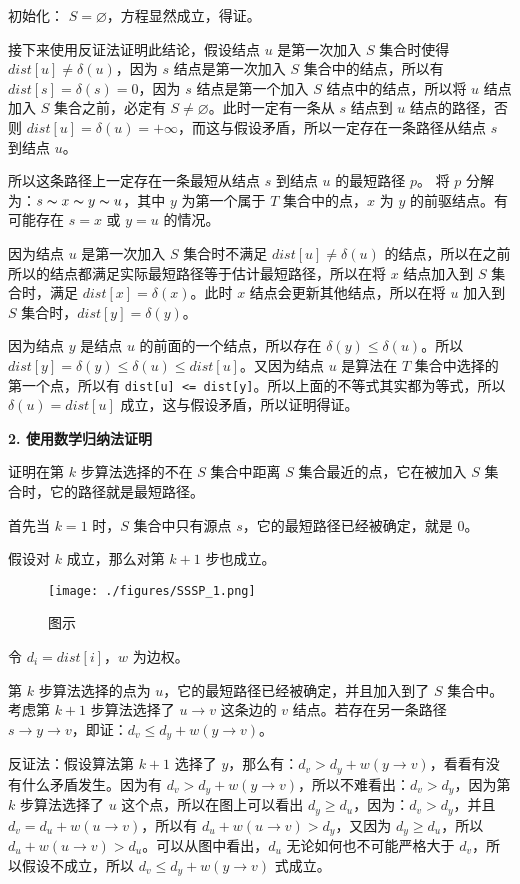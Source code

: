 初始化： $S = \varnothing$，方程显然成立，得证。

接下来使用反证法证明此结论，假设结点 $u$ 是第一次加入 $S$ 集合时使得 $dist[u] \neq \delta(u)$，因为 $s$ 结点是第一次加入 $S$ 集合中的结点，所以有 $dist[s] = \delta(s) = 0$，因为 $s$ 结点是第一个加入 $S$ 结点中的结点，所以将 $u$ 结点加入 $S$ 集合之前，必定有 $S \neq \varnothing$。此时一定有一条从 $s$ 结点到 $u$ 结点的路径，否则 $dist[u] = \delta(u) = +\infty$，而这与假设矛盾，所以一定存在一条路径从结点 $s$ 到结点 $u$。

所以这条路径上一定存在一条最短从结点 $s$ 到结点 $u$ 的最短路径 $p$。
将 $p$ 分解为：$s \thicksim x \thicksim y \thicksim u$，其中 $y$ 为第一个属于 $T$ 集合中的点，$x$ 为 $y$ 的前驱结点。有可能存在 $s = x$ 或 $y = u$ 的情况。

因为结点 $u$ 是第一次加入 $S$ 集合时不满足 $dist[u] \neq \delta(u)$ 的结点，所以在之前所以的结点都满足实际最短路径等于估计最短路径，所以在将 $x$ 结点加入到 $S$ 集合时，满足 $dist[x] = \delta(x)$。此时 $x$ 结点会更新其他结点，所以在将 $u$ 加入到 $S$ 集合时，$dist[y] = \delta(y)$。

因为结点 $y$ 是结点 $u$ 的前面的一个结点，所以存在 $\delta(y) \leq \delta(u)$。所以 $dist[y] = \delta(y) \leq \delta(u) \leq dist[u]$。又因为结点 $u$ 是算法在 $T$ 集合中选择的第一个点，所以有 \verb|dist[u] <= dist[y]|。所以上面的不等式其实都为等式，所以 $\delta(u) = dist[u]$ 成立，这与假设矛盾，所以证明得证。

\textbf{2. 使用数学归纳法证明}

证明在第 $k$ 步算法选择的不在 $S$ 集合中距离 $S$ 集合最近的点，它在被加入 $S$ 集合时，它的路径就是最短路径。

首先当 $k = 1$ 时，$S$ 集合中只有源点 $s$，它的最短路径已经被确定，就是 $0$。

假设对 $k$ 成立，那么对第 $k + 1$ 步也成立。

\begin{figure}[ht]
\centering
\texttt{[image: ./figures/SSSP\_1.png]}
\caption{图示} \label{SSSP_fig1}
\end{figure}

令 $d_i = dist[i]$，$w$ 为边权。

第 $k$ 步算法选择的点为 $u$，它的最短路径已经被确定，并且加入到了 $S$ 集合中。考虑第 $k + 1$ 步算法选择了 $u \to v$ 这条边的 $v$ 结点。若存在另一条路径 $s \to y \to v$，即证：$d_v \leq d_y + w(y \to v)$。

反证法：假设算法第 $k + 1$ 选择了 $y$，那么有：$d_v > d_y + w(y \to v)$，看看有没有什么矛盾发生。因为有 $d_v > d_y + w(y \to v)$，所以不难看出：$d_v > d_y$，因为第 $k$ 步算法选择了 $u$ 这个点，所以在图上可以看出 $d_y \geq d_u$，因为：$d_v > d_y$，并且 $d_v = d_u + w(u \to v)$，所以有 $d_u + w(u \to v) > d_y$，又因为 $d_y \geq d_u$，所以 $d_u + w(u \to v) > d_u$。可以从图中看出，$d_u$ 无论如何也不可能严格大于 $d_v$，所以假设不成立，所以 $d_v \leq d_y + w(y \to v)$ 式成立。 

